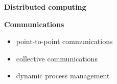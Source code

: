 \begin{frame}\begin{center}
		\LARGE\textbf{Distributed computing}
\end{center}\end{frame}
\begin{frame}\textbf{Communications}\vspace{0.3cm}

\begin{itemize}\setlength\itemsep{1em}
  \item point-to-point communications
  \item collective communications
  \item dynamic process management
\end{itemize}

\end{frame}
